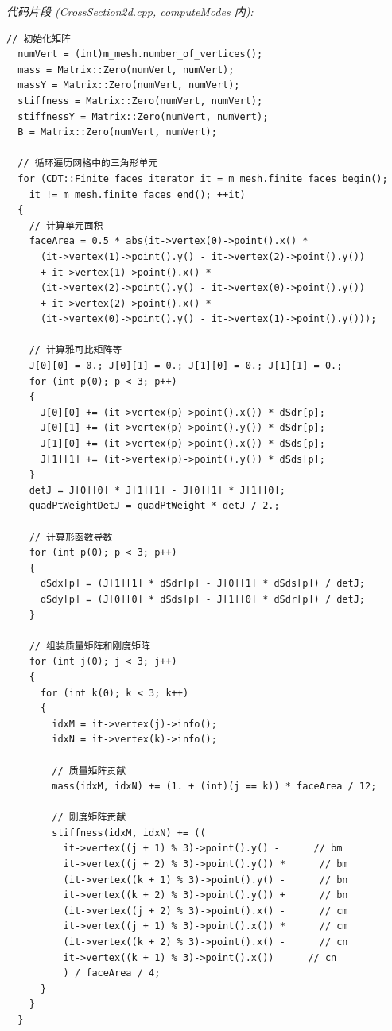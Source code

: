 \documentclass{ctexart}
\begin{document}
\textit{代码片段 (CrossSection2d.cpp, computeModes 内):}
\begin{lstlisting}[caption={组装质量矩阵和刚度矩阵}, label={lst:assembly}]
  // 初始化矩阵
  numVert = (int)m_mesh.number_of_vertices();
  mass = Matrix::Zero(numVert, numVert);
  massY = Matrix::Zero(numVert, numVert);
  stiffness = Matrix::Zero(numVert, numVert);
  stiffnessY = Matrix::Zero(numVert, numVert);
  B = Matrix::Zero(numVert, numVert);

  // 循环遍历网格中的三角形单元
  for (CDT::Finite_faces_iterator it = m_mesh.finite_faces_begin();
    it != m_mesh.finite_faces_end(); ++it)
  {
    // 计算单元面积
    faceArea = 0.5 * abs(it->vertex(0)->point().x() *
      (it->vertex(1)->point().y() - it->vertex(2)->point().y())
      + it->vertex(1)->point().x() *
      (it->vertex(2)->point().y() - it->vertex(0)->point().y())
      + it->vertex(2)->point().x() *
      (it->vertex(0)->point().y() - it->vertex(1)->point().y()));

    // 计算雅可比矩阵等
    J[0][0] = 0.; J[0][1] = 0.; J[1][0] = 0.; J[1][1] = 0.;
    for (int p(0); p < 3; p++)
    {
      J[0][0] += (it->vertex(p)->point().x()) * dSdr[p];
      J[0][1] += (it->vertex(p)->point().y()) * dSdr[p];
      J[1][0] += (it->vertex(p)->point().x()) * dSds[p];
      J[1][1] += (it->vertex(p)->point().y()) * dSds[p];
    }
    detJ = J[0][0] * J[1][1] - J[0][1] * J[1][0];
    quadPtWeightDetJ = quadPtWeight * detJ / 2.;

    // 计算形函数导数
    for (int p(0); p < 3; p++)
    {
      dSdx[p] = (J[1][1] * dSdr[p] - J[0][1] * dSds[p]) / detJ;
      dSdy[p] = (J[0][0] * dSds[p] - J[1][0] * dSdr[p]) / detJ;
    }

    // 组装质量矩阵和刚度矩阵
    for (int j(0); j < 3; j++)
    {
      for (int k(0); k < 3; k++)
      {
        idxM = it->vertex(j)->info();
        idxN = it->vertex(k)->info();

        // 质量矩阵贡献
        mass(idxM, idxN) += (1. + (int)(j == k)) * faceArea / 12;
        
        // 刚度矩阵贡献
        stiffness(idxM, idxN) += ((
          it->vertex((j + 1) % 3)->point().y() -      // bm
          it->vertex((j + 2) % 3)->point().y()) *      // bm
          (it->vertex((k + 1) % 3)->point().y() -      // bn
          it->vertex((k + 2) % 3)->point().y()) +      // bn
          (it->vertex((j + 2) % 3)->point().x() -      // cm
          it->vertex((j + 1) % 3)->point().x()) *      // cm
          (it->vertex((k + 2) % 3)->point().x() -      // cn
          it->vertex((k + 1) % 3)->point().x())      // cn
          ) / faceArea / 4;
      }
    }
  }
\end{lstlisting}
\end{document}
